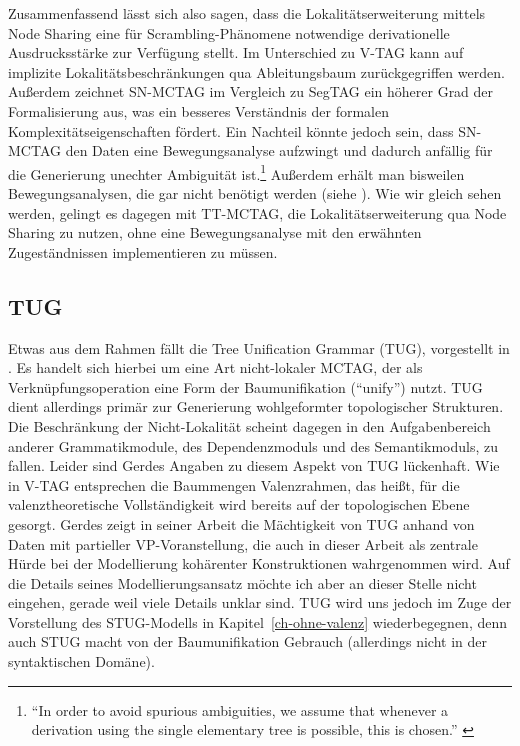 Zusammenfassend lässt sich also sagen, dass die Lokalitätserweiterung mittels Node Sharing eine für Scrambling-Phänomene notwendige derivationelle Ausdrucksstärke zur Verfügung stellt. Im Unterschied zu V-TAG kann auf implizite Lokalitätsbeschränkungen qua Ableitungsbaum zurückgegriffen werden. Au\ss erdem zeichnet SN-MCTAG im Vergleich zu SegTAG ein höherer Grad der Formalisierung aus, was ein besseres Verständnis der formalen Komplexitätseigenschaften fördert. Ein Nachteil könnte jedoch sein, dass SN-MCTAG den Daten eine Bewegungsanalyse aufzwingt und dadurch anfällig für die Generierung unechter Ambiguität ist.\footnote{"`In order to avoid spurious ambiguities, we assume that whenever a derivation using the single elementary tree is possible, this is chosen."' \cite[203]{Kallmeyer:05}} Au\ss erdem erhält man bisweilen Bewegungsanalysen, die gar nicht benötigt werden (siehe \citealt[205]{Kallmeyer:05}). Wie wir gleich sehen  werden, gelingt es dagegen mit TT-MCTAG, die Lokalitätserweiterung qua Node Sharing zu nutzen, ohne eine Bewegungsanalyse mit den erwähnten Zugeständnissen implementieren zu müssen.      


\subsection{TUG}

Etwas aus dem Rahmen fällt die Tree Unification Grammar (TUG), vorgestellt in \cite{Gerdes:04}. Es handelt sich hierbei um eine Art nicht-lokaler MCTAG, der als Verknüpfungsoperation eine Form der Baumunifikation ("`unify"') nutzt. TUG dient allerdings primär zur Generierung wohlgeformter topologischer Strukturen. Die Beschränkung der Nicht-Lokalität scheint dagegen in den Aufgabenbereich anderer Grammatikmodule, des Dependenzmoduls und des Semantikmoduls, zu fallen. Leider sind Gerdes Angaben zu diesem Aspekt von TUG lückenhaft. Wie in V-TAG entsprechen die Baummengen Valenzrahmen, das hei\ss t, für die valenztheoretische Vollständigkeit wird bereits auf der topologischen Ebene gesorgt. Gerdes zeigt in seiner Arbeit die Mächtigkeit von TUG anhand von Daten mit partieller VP-Voranstellung, die auch in dieser Arbeit als zentrale Hürde bei der Modellierung kohärenter Konstruktionen wahrgenommen wird. Auf die Details seines Modellierungsansatz möchte ich aber an dieser Stelle nicht eingehen, gerade weil viele Details unklar sind. TUG wird uns jedoch im Zuge der Vorstellung des STUG-Modells in Kapitel~\ref{ch-ohne-valenz} wiederbegegnen, denn auch STUG macht von der Baumunifikation Gebrauch (allerdings nicht in der syntaktischen Domäne). 




